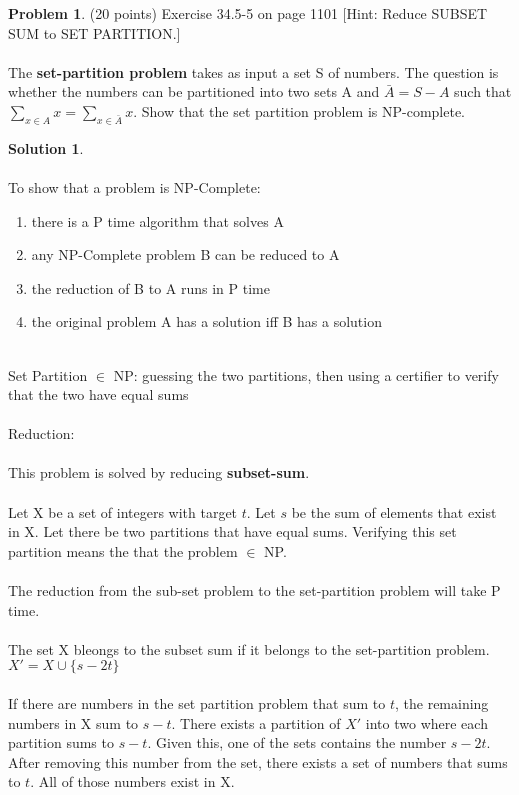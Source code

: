 \documentclass{article}
\theoremstyle{definition}
\newtheorem{problem}{Problem}
\newtheorem*{solution}{Solution}
\begin{document}
\begin{problem} (20 points) %
Exercise 34.5-5 on page 1101 [Hint: Reduce SUBSET SUM
to SET PARTITION.] \\
\\
The \textbf{set-partition problem} takes as input a set S of numbers. The question is whether the numbers can be partitioned into two sets A and $\bar{A} = S - A$ such that $\sum_{x \in A} x = \sum_{x \in \bar{A}} x$. Show that the set partition problem is NP-complete.

\end{problem}
\begin{solution} \\
\\
To show that a problem is NP-Complete:
\begin{enumerate}
    \item there is a P time algorithm that solves A
    \item any NP-Complete problem B can be reduced to A
    \item the reduction of B to A runs in P time
    \item the original problem A has a solution iff B has a solution
\end{enumerate}
\\
Set Partition $\in$ NP: guessing the two partitions, then using a certifier to verify that the two have equal sums\\
\\
Reduction:\\
\\
This problem is solved by reducing \textbf{subset-sum}.\\
\\
Let X be a set of integers with target $t$. Let $s$ be the sum of elements that exist in X. Let there be two partitions that have equal sums. Verifying this set partition means the that the problem $\in$ NP.\\
\\
The reduction from the sub-set problem to the set-partition problem will take P time.\\
\\
The set X bleongs to the subset sum if it belongs to the set-partition problem. $X' = X \cup \{s-2t\}$\\
\\
If there are numbers in the set partition problem that sum to $t$, the remaining numbers in X sum to $s-t$. There exists a partition of $X'$ into two where each partition sums to $s-t$. Given this, one of the sets contains the number $s-2t$. After removing this number from the set, there exists a set of numbers that sums to $t$. All of those numbers exist in X.\\
\\
\end{solution}

\medskip



\goodbreak
\checklist
\end{document}
